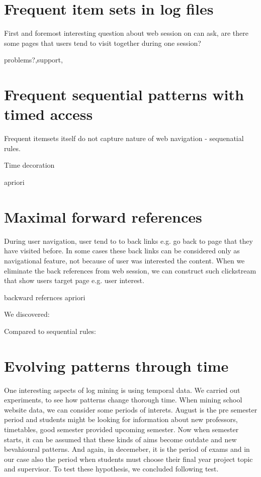 \documentclass[english,a4paper]{article}
\begin{document}
\section{Frequent item sets in log files} 
First and foremost interesting question about web session on can ask, are there some pages that users tend to visit together during one session?



problems?,support,


\section{Frequent sequential patterns with timed access}
Frequent itemsets itself do not capture nature of web navigation - sequenatial rules. 

Time decoration

apriori 

\section{Maximal forward references}
During user navigation, user tend to to back links e.g. go back to page that they have visited before. In some cases these back links can be considered only as navigational feature, not because of user was interested the content.  When we eliminate the back references from web session, we can construct such clickstream that show users target page e.g. user interest.

backward refernces
apriori

We discovered:

Compared to sequential rules:


\section{Evolving patterns through time} 
One interesting aspects of log mining is using temporal data. We carried out experiments, to see how patterns change thorough time. When mining school website data, we can consider some periods of interets. August is the pre semester period and students might be looking for information about new professors, timetables, good semester provided upcoming semester. Now when semester starts, it can be assumed that these kinds of aims become outdate and new bevahioural patterns. And again, in decemeber, it is the period of exams and in our case also the period when students must choose their final year project topic and supervisor. To test these hypothesis, we concluded following test. 
\end{document}
